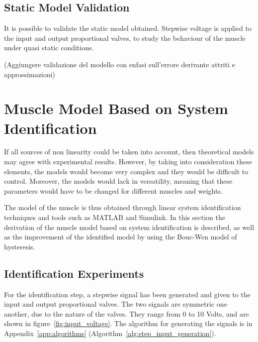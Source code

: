 \subsection{Static Model Validation}


It is possible to validate the static model obtained. Stepwise voltage is applied
to the input and output proportional valves, to study the behaviour of the muscle
under quasi static conditions.

{\color{red}(Aggiungere validazione del modello con enfasi sull'errore derivante attriti e approssimazioni)}

\clearpage

\section{Muscle Model Based on System Identification}

If all sources of non linearity could be taken into account,
then theoretical models may agree with experimental results.
However, by taking into consideration these elements, the models would become
very complex and they would be difficult to control. 
Moreover, the models would lack in versatility, meaning that these parameters
would have to be changed for different muscles and weights.

The model of the muscle is thus obtained through
linear system identification techniques and tools such as MATLAB and Simulink.
In this section the derivation of the muscle model based on system identification
is described, as well as the improvement of the identified model
by using the Bouc-Wen model of hysteresis.


\subsection{Identification Experiments}
\label{sec:4.ide}

For the identification step, a stepwise signal has been generated
and given to the input and output proportional valves. The two signals are symmetric
one another, due to the nature of the valves. They range from 0 to 10 Volts,
and are shown in figure~\ref{fig:input_voltage}. The algorithm for generating the signals
is in Appendix~\ref{app:algorithms} (Algorithm~\ref{alg:step_input_generation}).

